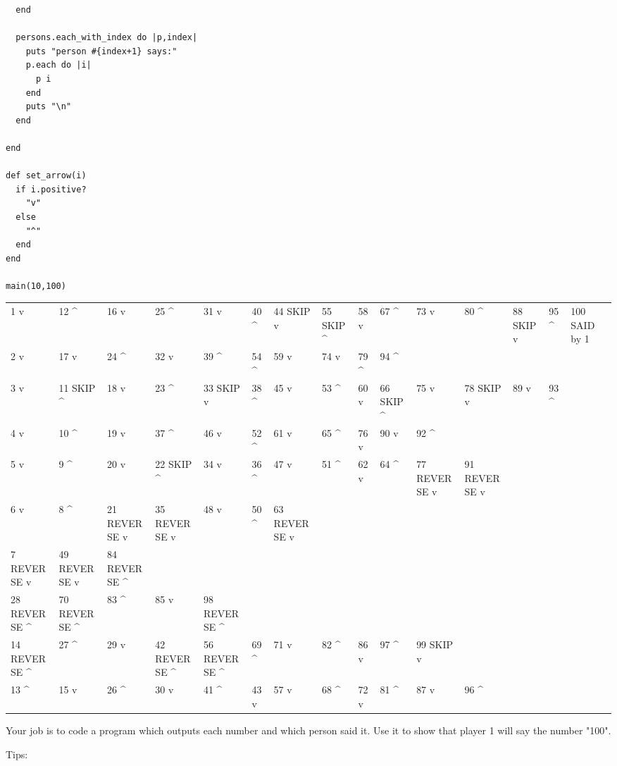 \documentclass[11pt]{article}
\begin{document}
\begin{itemize}
\begin{verbatim}
  end

  persons.each_with_index do |p,index|
    puts "person #{index+1} says:"
    p.each do |i|
      p i
    end
    puts "\n"
  end

end

def set_arrow(i)
  if i.positive?
    "v"
  else
    "^"
  end
end

main(10,100)
\end{verbatim}

\begin{center}
\begin{tabular}{lllllllllllllll}
1 v & 12 \^{} & 16 v & 25 \^{} & 31 v & 40 \^{} & 44 SKIP v & 55 SKIP \^{} & 58 v & 67 \^{} & 73 v & 80 \^{} & 88 SKIP v & 95 \^{} & 100 SAID by 1\\
2 v & 17 v & 24 \^{} & 32 v & 39 \^{} & 54 \^{} & 59 v & 74 v & 79 \^{} & 94 \^{} &  &  &  &  & \\
3 v & 11 SKIP \^{} & 18 v & 23 \^{} & 33 SKIP v & 38 \^{} & 45 v & 53 \^{} & 60 v & 66 SKIP \^{} & 75 v & 78 SKIP v & 89 v & 93 \^{} & \\
4 v & 10 \^{} & 19 v & 37 \^{} & 46 v & 52 \^{} & 61 v & 65 \^{} & 76 v & 90 v & 92 \^{} &  &  &  & \\
5 v & 9 \^{} & 20 v & 22 SKIP \^{} & 34 v & 36 \^{} & 47 v & 51 \^{} & 62 v & 64 \^{} & 77 REVERSE v & 91 REVERSE v &  &  & \\
6 v & 8 \^{} & 21 REVERSE v & 35 REVERSE v & 48 v & 50 \^{} & 63 REVERSE v &  &  &  &  &  &  &  & \\
7 REVERSE v & 49 REVERSE v & 84 REVERSE \^{} &  &  &  &  &  &  &  &  &  &  &  & \\
28 REVERSE \^{} & 70 REVERSE \^{} & 83 \^{} & 85 v & 98 REVERSE \^{} &  &  &  &  &  &  &  &  &  & \\
14 REVERSE \^{} & 27 \^{} & 29 v & 42 REVERSE \^{} & 56 REVERSE \^{} & 69 \^{} & 71 v & 82 \^{} & 86 v & 97 \^{} & 99 SKIP v &  &  &  & \\
13 \^{} & 15 v & 26 \^{} & 30 v & 41 \^{} & 43 v & 57 v & 68 \^{} & 72 v & 81 \^{} & 87 v & 96 \^{} &  &  & \\
\end{tabular}
\end{center}
\end{itemize}




Your job is to code a program which outputs each number and which person said 
it. Use it to show that  player 1 will say the number "100".

Tips:
\end{document}
